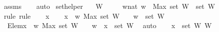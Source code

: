 \begin{isabellebody}
%
\isatagproof
{}\isamarkupfalse%
\ assms\isanewline
\ \ \isamarkupfalse%
\ auto%
\endisatagproof
{\isafoldproof}%
%
\isadelimproof
\isanewline
%
\endisadelimproof
\isanewline
{}\isamarkupfalse%
\ set{\isacharunderscore}{\kern0pt}helper{\isacharunderscore}{\kern0pt}{}{\isacharcolon}{\kern0pt}\isanewline
\ \ \ {\isachardoublequoteopen}W\ {\isasymnoteq}\ {\isacharbrackleft}{\kern0pt}{\isacharbrackright}{\kern0pt}{\isachardoublequoteclose}\isanewline
\ \ \ {\isachardoublequoteopen}{\isacharbraceleft}{\kern0pt}w{\isacharcolon}{\kern0pt}{\isacharcolon}{\kern0pt}nat{\isachardot}{\kern0pt}\ w\ {\isasymge}\ {\isacharparenleft}{\kern0pt}Max\ {\isacharparenleft}{\kern0pt}set\ W{\isacharparenright}{\kern0pt}{\isacharparenright}{\kern0pt}{\isacharplus}{\kern0pt}{}{\isacharbraceright}{\kern0pt}\ {\isasyminter}\ {\isacharparenleft}{\kern0pt}set\ W{\isacharparenright}{\kern0pt}\ {\isacharequal}{\kern0pt}\ {\isacharbraceleft}{\kern0pt}{\isacharbraceright}{\kern0pt}{\isachardoublequoteclose}\isanewline
%
\isadelimproof
%
\endisadelimproof
%
\isatagproof
{}\isamarkupfalse%
\ {\isacharparenleft}{\kern0pt}rule{\isacharcomma}{\kern0pt}\ rule{\isacharparenright}{\kern0pt}\isanewline
\ \ \isamarkupfalse%
\ x\isanewline
\ \ \isamarkupfalse%
\ {\isachardoublequoteopen}x\ {\isasymin}\ {\isacharbraceleft}{\kern0pt}w{\isachardot}{\kern0pt}\ Max\ {\isacharparenleft}{\kern0pt}set\ W{\isacharparenright}{\kern0pt}\ {\isacharplus}{\kern0pt}\ {}\ {\isasymle}\ w{\isacharbraceright}{\kern0pt}\ {\isasyminter}\ set\ W{\isachardoublequoteclose}\isanewline
\ \ \isamarkupfalse%
\ \ Elem{}{\isacharcolon}{\kern0pt}{\isachardoublequoteopen}x\ {\isasymin}\ {\isacharbraceleft}{\kern0pt}w{\isachardot}{\kern0pt}\ Max\ {\isacharparenleft}{\kern0pt}set\ W{\isacharparenright}{\kern0pt}\ {\isacharplus}{\kern0pt}\ {}\ {\isasymle}\ w{\isacharbraceright}{\kern0pt}{\isachardoublequoteclose}\ \ {\isachardoublequoteopen}x\ {\isasymin}\ {\isacharparenleft}{\kern0pt}set\ W{\isacharparenright}{\kern0pt}{\isachardoublequoteclose}\ \isamarkupfalse%
\ auto\isanewline
\ \ \isamarkupfalse%
\ {\isacartoucheopen}x\ {\isasymin}\ {\isacharparenleft}{\kern0pt}set\ W{\isacharparenright}{\kern0pt}{\isacartoucheclose}\ {\isacartoucheopen}W\ {\isasymnoteq}\ {\isacharbrackleft}{\kern0pt}{\isacharbrackright}{\kern0pt}{\isacartoucheclose}\ \isamarkupfalse%

\end{isabellebody}
